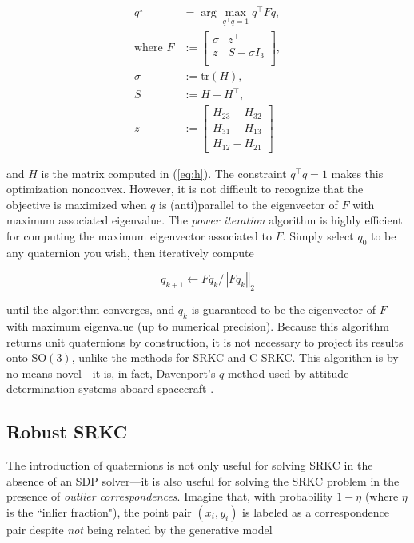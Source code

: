 \documentclass[conference]{IEEEtran}
\begin{document}
\begin{align}
	q^\star &= \arg \max_{q^\top q = 1} q^\top F q , \\
	\text{where } F &:= \begin{bmatrix}
		\sigma & z^\top \\
		z & S - \sigma I_3 \\
	\end{bmatrix}  ,\\
	\sigma &:= \mathrm{tr}(H) , \\
	S &:= H + H^\top , \\
	z &:= \begin{bmatrix}
		H_{23} - H_{32} \\
		H_{31} - H_{13} \\
		H_{12} - H_{21}
	\end{bmatrix}
\end{align}

and \( H \) is the matrix computed in (\ref{eq:h}).  The constraint \( q^\top q = 1 \) makes this optimization nonconvex.  However, it is not difficult to recognize that the objective is maximized when \( q \) is (anti)parallel to the eigenvector of \( F \) with maximum associated eigenvalue.  The \textit{power iteration} algorithm is highly efficient for computing the maximum eigenvector associated to \( F \).  Simply select \( q_0 \) to be any quaternion you wish, then iteratively compute

\begin{equation}
	q_{k+1} \gets F q_k / \left\Vert F q_k \right\Vert_2
\end{equation}

until the algorithm converges, and \( q_k \) is guaranteed to be the eigenvector of \( F \) with maximum eigenvalue (up to numerical precision).  Because this algorithm returns unit quaternions by construction, it is not necessary to project its results onto \( \mathrm{SO(3)} \), unlike the methods for SRKC and C-SRKC.  This algorithm is by no means novel---it is, in fact, Davenport's \( q \)-method used by attitude determination systems aboard spacecraft \cite{davenport}.

\subsection{Robust SRKC}

The introduction of quaternions is not only useful for solving SRKC in the absence of an SDP solver---it is also useful for solving the SRKC problem in the presence of \textit{outlier correspondences}.  Imagine that, with probability \( 1 - \eta \) (where \( \eta \) is the ``inlier fraction"), the point pair \( (x_i, y_i) \) is labeled as a correspondence pair despite \textit{not} being related by the generative model
\end{document}
